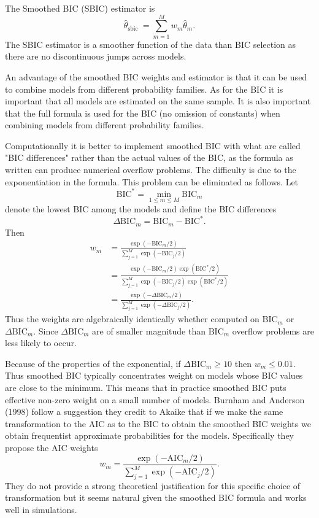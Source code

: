 \documentclass[10pt]{article}
\begin{document}
The Smoothed BIC (SBIC) estimator is
$$
\widehat{\theta}_{\text {sbic }}=\sum_{m=1}^{M} w_{m} \widehat{\theta}_{m} .
$$
The SBIC estimator is a smoother function of the data than BIC selection as there are no discontinuous jumps across models.

An advantage of the smoothed BIC weights and estimator is that it can be used to combine models from different probability families. As for the BIC it is important that all models are estimated on the same sample. It is also important that the full formula is used for the BIC (no omission of constants) when combining models from different probability families.

Computationally it is better to implement smoothed BIC with what are called "BIC differences" rather than the actual values of the BIC, as the formula as written can produce numerical overflow problems. The difficulty is due to the exponentiation in the formula. This problem can be eliminated as follows. Let
$$
\mathrm{BIC}^{*}=\min _{1 \leq m \leq M} \mathrm{BIC}_{m}
$$
denote the lowest BIC among the models and define the BIC differences
$$
\Delta \mathrm{BIC}_{m}=\mathrm{BIC}_{m}-\mathrm{BIC}^{*} .
$$
Then
$$
\begin{aligned}
w_{m} &=\frac{\exp \left(-\mathrm{BIC}_{m} / 2\right)}{\sum_{j=1}^{M} \exp \left(-\mathrm{BIC}_{j} / 2\right)} \\
&=\frac{\exp \left(-\mathrm{BIC}_{m} / 2\right) \exp \left(\mathrm{BIC}^{*} / 2\right)}{\sum_{j=1}^{M} \exp \left(-\mathrm{BIC}_{j} / 2\right) \exp \left(\mathrm{BIC}^{*} / 2\right)} \\
&=\frac{\exp \left(-\Delta \mathrm{BIC}_{m} / 2\right)}{\sum_{j=1}^{M} \exp \left(-\Delta \mathrm{BIC}_{j} / 2\right)} .
\end{aligned}
$$
Thus the weights are algebraically identically whether computed on $\mathrm{BIC}_{m}$ or $\Delta \mathrm{BIC}_{m}$. Since $\Delta \mathrm{BIC}_{m}$ are of smaller magnitude than $\mathrm{BIC}_{m}$ overflow problems are less likely to occur.

Because of the properties of the exponential, if $\Delta \mathrm{BIC}_{m} \geq 10$ then $w_{m} \leq 0.01$. Thus smoothed BIC typically concentrates weight on models whose BIC values are close to the minimum. This means that in practice smoothed BIC puts effective non-zero weight on a small number of models. Burnham and Anderson (1998) follow a suggestion they credit to Akaike that if we make the same transformation to the AIC as to the BIC to obtain the smoothed BIC weights we obtain frequentist approximate probabilities for the models. Specifically they propose the AIC weights
$$
w_{m}=\frac{\exp \left(-\mathrm{AIC}_{m} / 2\right)}{\sum_{j=1}^{M} \exp \left(-\mathrm{AIC}_{j} / 2\right)} .
$$
They do not provide a strong theoretical justification for this specific choice of transformation but it seems natural given the smoothed BIC formula and works well in simulations.
\end{document}
